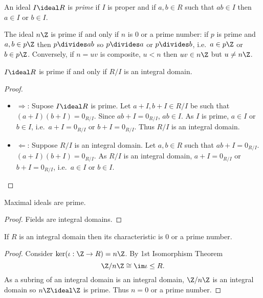 \documentclass[a4paper]{article}
\theoremstyle{definition}
\begin{document}
\begin{definition}
  An ideal \(I \ideal R\) is \emph{prime} if \(I\) is proper and if \(a, b \in R\) such that \(ab \in I\) then \(a \in I\) or \(b \in I\).
\end{definition}

\begin{eg}
  The ideal \(n\Z\) is prime if and only if \(n\) is \(0\) or a prime number: if \(p\) is prime and \(a, b \in p\Z\) then \(p \divides ab\) so \(p \divides a\) or \(p \divides b\), i.e.\ \(a \in p\Z\) or \(b \in p\Z\). Conversely, if \(n = uv\) is composite, \(u < n\) then \(uv \in n\Z\) but \(u \neq n\Z\).
\end{eg}

\begin{lemma}
  \(I \ideal R\) is prime if and only if \(R/I\) is an integral domain.
\end{lemma}

\begin{proof}\leavevmode
  \begin{itemize}
  \item \(\Rightarrow\): Supose \(I \ideal R\) is prime. Let \(a + I, b + I \in R/I\) be such that \((a + I)(b + I) = 0_{R/I}\). Since \(ab + I = 0_{R/I}\), \(ab \in I\). As \(I\) is prime, \(a \in I\) or \(b \in I\), i.e.\ \(a + I = 0_{R/I}\) or \(b + I = 0_{R/I}\). Thus \(R/I\) is an integral domain.
  \item \(\Leftarrow\): Suppose \(R/I\) is an integral domain. Let \(a, b \in R\) such that \(ab + I = 0_{R/I}\). \((a + I)(b + I) = 0_{R/I}\). As \(R/I\) is an integral domain, \(a + I = 0_{R/I}\) or \(b + I = 0_{R/I}\), i.e.\ \(a \in I\) or \(b \in I\).
  \end{itemize}
\end{proof}

\begin{corollary}
  Maximal ideals are prime.
\end{corollary}

\begin{proof}
  Fields are integral domains.
\end{proof}

\begin{lemma}
  If \(R\) is an integral domain then its characteristic is \(0\) or a prime number.
\end{lemma}

\begin{proof}
  Consider \(\ker (\iota: \Z \to R) = n\Z\). By 1st Isomorphism Theorem
  \[
    \Z/n\Z \cong \im \iota \leq R.
  \]
  As a subring of an integral domain is an integral domain, \(\Z/n\Z\) is an integral domain so \(n\Z \ideal \Z\) is prime. Thus \(n = 0\) or a prime number.
\end{proof}
\end{document}
